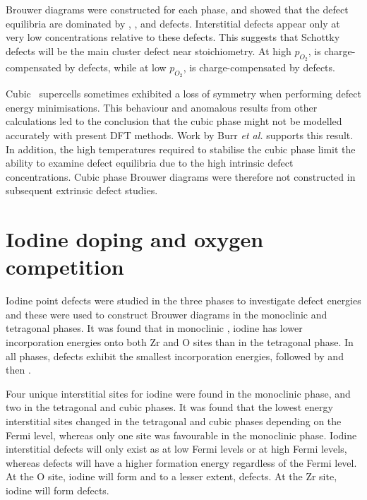 Brouwer diagrams were constructed for each phase, and showed that the defect equilibria are dominated by , ,  and  defects. Interstitial defects appear only at very low concentrations relative to these defects. This suggests that Schottky defects will be the main cluster defect near stoichiometry. At high $p_{O_{2}}$,  is charge-compensated by  defects, while at low $p_{O_{2}}$,  is charge-compensated by  defects.

Cubic \zirconia\ supercells sometimes exhibited a loss of symmetry when performing defect energy minimisations. This behaviour and anomalous results from other calculations led to the conclusion that the cubic phase might not be modelled accurately with present DFT methods. Work by Burr \emph{et al.} \cite{burr2017importance} supports this result. In addition, the high temperatures required to stabilise the cubic phase limit the ability to examine defect equilibria due to the high intrinsic defect concentrations. Cubic phase Brouwer diagrams were therefore not constructed in subsequent extrinsic defect studies.

\section{Iodine doping and oxygen competition}

Iodine point defects were studied in the three phases to investigate defect energies and these were used to construct Brouwer diagrams in the monoclinic and tetragonal phases. It was found that in monoclinic \zirconia , iodine has lower incorporation energies onto both Zr and O sites than in the tetragonal phase. In all phases,  defects exhibit the smallest incorporation energies, followed by  and then . 

Four unique interstitial sites for iodine were found in the monoclinic phase, and two in the tetragonal and cubic phases. It was found that the lowest energy interstitial sites changed in the tetragonal and cubic phases depending on the Fermi level, whereas only one site was favourable in the monoclinic phase. Iodine interstitial defects will only exist as  at low Fermi levels or  at high Fermi levels, whereas  defects will have a higher formation energy regardless of the Fermi level. At the O site, iodine will form  and to a lesser extent,  defects. At the Zr site, iodine will form  defects. 

